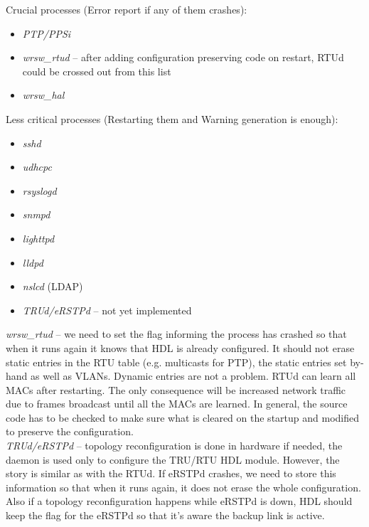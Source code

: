 \begin{pck_descr}
				Crucial processes (Error report if any of them crashes):
				\begin{itemize}
					\item \emph{PTP/PPSi}
					\item \emph{wrsw\_rtud} -- after adding configuration preserving code
						on restart, RTUd could be crossed out from this list
					\item \emph{wrsw\_hal}
				\end{itemize}
				Less critical processes (Restarting them and Warning generation is
				enough):
				\begin{itemize}
					\item \emph{sshd}
					\item \emph{udhcpc}
					\item \emph{rsyslogd}
					\item \emph{snmpd}
					\item \emph{lighttpd}
					\item \emph{lldpd}
					\item \emph{nslcd} (LDAP)
					\item \emph{TRUd/eRSTPd} -- not yet implemented
				\end{itemize}

				\emph{wrsw\_rtud} -- we need to set the flag informing the process has
				crashed so that when it runs again it knows that HDL is already
				configured. It should not erase static entries in the RTU table (e.g.
				multicasts for PTP), the static entries set by-hand as well as VLANs.
				Dynamic entries are not a problem. RTUd can learn all MACs after
				restarting. The only consequence will be increased network traffic due
				to frames broadcast until all the MACs are learned. In general,
				the source code has to be checked to make sure what is cleared on the
				startup and modified to preserve the configuration.\\

				\emph{TRUd/eRSTPd} -- topology reconfiguration is done in hardware if
				needed, the daemon is used only to configure the TRU/RTU HDL module.
				However, the story is similar as with the RTUd. If eRSTPd crashes, we
				need to store this information so that when it runs again, it does not
				erase the whole configuration. Also if a topology reconfiguration
				happens while eRSTPd is down, HDL should keep the flag for the eRSTPd so
				that it's aware the backup link is active.
		\end{pck_descr}

